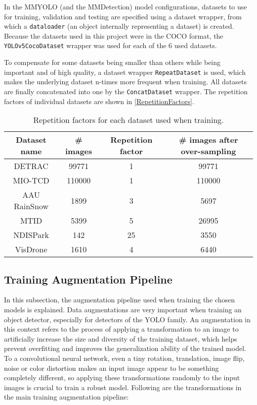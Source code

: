 In the MMYOLO (and the MMDetection) model configurations, datasets to use for
training, validation and testing are specified using a dataset wrapper, from
which a \texttt{dataloader} (an object internally representing a dataset) is
created. Because the datasets used in this project were in the COCO format, the
\texttt{YOLOv5CocoDataset} wrapper was used for each of the 6 used datasets.

To compensate for some datasets being smaller than others while being important
and of high quality, a dataset wrapper \texttt{RepeatDataset} is used, which
makes the underlying dataset n-times more frequent when training. All datasets are finally
concatenated into one by the \texttt{ConcatDataset} wrapper. The repetition
factors of individual datasets are shown in \autoref{RepetitionFactors}.

\begin{table}[h]
\centering
\small
\begin{tabular}{|c|c|c|c|}
    \hline
    Dataset name & \# images & Repetition factor & \# images after over-sampling \\
    \hline
    DETRAC       &  \num{99771} &  1 & \num{99771} \\
    MIO-TCD      & \num{110000} &  1 & \num{110000} \\
    AAU RainSnow &   \num{1899} &  3 & \num{5697} \\
    MTID         &   \num{5399} &  5 & \num{26995} \\
    NDISPark     &    \num{142} & 25 & \num{3550} \\
    VisDrone     &   \num{1610} &  4 & \num{6440} \\
    \hline
\end{tabular}
\caption{Repetition factors for each dataset used when training.}
\label{RepetitionFactors}
\end{table}



\subsection{Training Augmentation Pipeline}

In this subsection, the augmentation pipeline used when training the chosen
models is explained. Data augmentations are very important when training an
object detector, especially for detectors of the YOLO family. An augmentation
in this context refers to the process of applying a transformation to an
image to artificially increase the size and diversity of the training dataset,
which helps prevent overfitting and improves the generalization ability of the
trained model. To a convolutional neural network, even a tiny rotation,
translation, image flip, noise or color distortion makes an input image appear
to be something completely different, so applying these transformations randomly
to the input images is crucial to train a robust model. Following are the
transformations in the main training augmentation pipeline:

